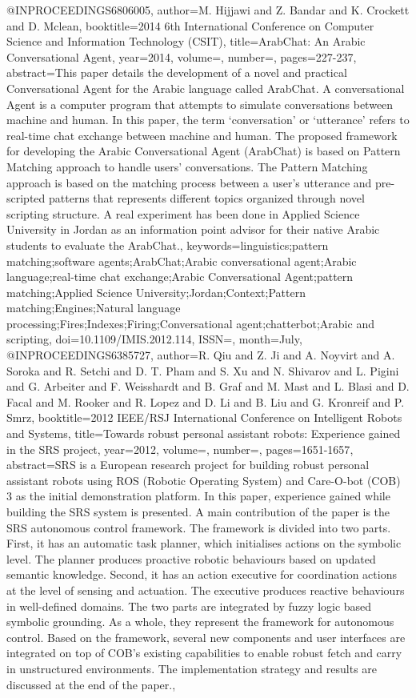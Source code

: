 {@INPROCEEDINGS{6806005, 
author={M. Hijjawi and Z. Bandar and K. Crockett and D. Mclean}, 
booktitle={2014 6th International Conference on Computer Science and Information Technology (CSIT)}, 
title={ArabChat: An Arabic Conversational Agent}, 
year={2014}, 
volume={}, 
number={}, 
pages={227-237}, 
abstract={This paper details the development of a novel and practical Conversational Agent for the Arabic language called ArabChat. A conversational Agent is a computer program that attempts to simulate conversations between machine and human. In this paper, the term `conversation' or `utterance' refers to real-time chat exchange between machine and human. The proposed framework for developing the Arabic Conversational Agent (ArabChat) is based on Pattern Matching approach to handle users' conversations. The Pattern Matching approach is based on the matching process between a user's utterance and pre-scripted patterns that represents different topics organized through novel scripting structure. A real experiment has been done in Applied Science University in Jordan as an information point advisor for their native Arabic students to evaluate the ArabChat.}, 
keywords={linguistics;pattern matching;software agents;ArabChat;Arabic conversational agent;Arabic language;real-time chat exchange;Arabic Conversational Agent;pattern matching;Applied Science University;Jordan;Context;Pattern matching;Engines;Natural language processing;Fires;Indexes;Firing;Conversational agent;chatterbot;Arabic and scripting}, 
doi={10.1109/IMIS.2012.114}, 
ISSN={}, 
month={July},}
@INPROCEEDINGS{6385727, 
author={R. Qiu and Z. Ji and A. Noyvirt and A. Soroka and R. Setchi and D. T. Pham and S. Xu and N. Shivarov and L. Pigini and G. Arbeiter and F. Weisshardt and B. Graf and M. Mast and L. Blasi and D. Facal and M. Rooker and R. Lopez and D. Li and B. Liu and G. Kronreif and P. Smrz}, 
booktitle={2012 IEEE/RSJ International Conference on Intelligent Robots and Systems}, 
title={Towards robust personal assistant robots: Experience gained in the SRS project}, 
year={2012}, 
volume={}, 
number={}, 
pages={1651-1657}, 
abstract={SRS is a European research project for building robust personal assistant robots using ROS (Robotic Operating System) and Care-O-bot (COB) 3 as the initial demonstration platform. In this paper, experience gained while building the SRS system is presented. A main contribution of the paper is the SRS autonomous control framework. The framework is divided into two parts. First, it has an automatic task planner, which initialises actions on the symbolic level. The planner produces proactive robotic behaviours based on updated semantic knowledge. Second, it has an action executive for coordination actions at the level of sensing and actuation. The executive produces reactive behaviours in well-defined domains. The two parts are integrated by fuzzy logic based symbolic grounding. As a whole, they represent the framework for autonomous control. Based on the framework, several new components and user interfaces are integrated on top of COB's existing capabilities to enable robust fetch and carry in unstructured environments. The implementation strategy and results are discussed at the end of the paper.}, 
}}
